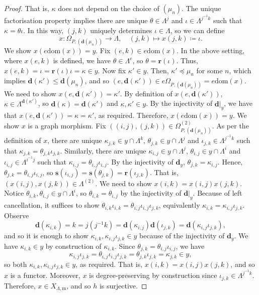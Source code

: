 \documentclass[11pt]{amsart}
\theoremstyle{definition}
\numberwithin{thm}{section}
\numberwithin{equation}{section}
\newcommand{\range}{\mathbf{r}}
\newcommand{\source}{\mathbf{s}}
\newcommand{\degree}{\mathbf{d}}
\newcommand{\morphdom}[1]{\mathrm{dom}(#1)}
\newcommand{\M}{\mathrm{m}}
\newcommand{\PS}[2]{X_{#2, #1}}
\newcommand{\composablepairs}[1]{#1^{(2)}}
\begin{document}
\begin{proof}
That is, $\kappa$ does not depend on the choice of $(\mu_n)$. 
The unique factorisation property implies there are unique $\theta \in \Lambda^j$ and $\iota \in \Lambda^{j^{-1}k}$ such that $\kappa = \theta\iota$. 
In this way, $(j, k)$ uniquely determines $\iota \in \Lambda$, so we can define
\[
x \colon \Omega_{P, (\degree(\mu_n))} \to \Lambda, \quad 
(j, k) \mapsto x(j, k) \coloneqq \iota.
\]
We show $x(e\morphdom{x}) = y$.
Fix $(e, k) \in e\morphdom{x}$.
In the above setting, where $x(e, k)$ is defined, we have $\theta \in \Lambda^e$, so $\theta = \range(\iota)$. 
Thus, $x(e, k) = \iota = \range(\iota)\iota = \kappa \in y$. 
Now fix $\kappa' \in y$. 
Then, $\kappa' \preceq \mu_n$ for some $n$, which implies $\degree(\kappa') \leq \degree(\mu_n)$, and so $(e, \degree(\kappa')) \in e\Omega_{P, (\degree(\mu_n))} = e\morphdom{x}$. 
We need to show $x(e, \degree(\kappa')) = \kappa'$. 
By definition of $x(e, \degree(\kappa'))$, $\kappa \in \Lambda^{\degree(\kappa')}$, so $\degree(\kappa) = \degree(\kappa')$ and $\kappa, \kappa' \in y$. 
By the injectivity of $\degree|_y$, we have that $x(e, \degree(\kappa')) = \kappa = \kappa'$, as required.
Therefore, $x(e\morphdom{x}) = y$.
We show $x$ is a graph morphism.
Fix $((i, j), (j, k)) \in \composablepairs{\Omega_{P, (\degree(\mu_n))}}$.
As per the definition of $x$, there are unique $\kappa_{j, k} \in y \cap \Lambda^k$, $\theta_{j, k} \in y \cap \Lambda^j$ and $\iota_{j, k} \in \Lambda^{j^{-1}k}$ such that $\kappa_{j, k} = \theta_{j, k}\iota_{j, k}$.
Similarly, there are unique $\kappa_{i, j} \in y \cap \Lambda^j$, $\theta_{i, j} \in y \cap \Lambda^i$ and $\iota_{i, j} \in \Lambda^{i^{-1}j}$ such that $\kappa_{i, j} = \theta_{i, j}\iota_{i, j}$. 
By the injectivity of $\degree_y$, $\theta_{j, k} = \kappa_{i, j}$. 
Hence, $\theta_{j, k} = \theta_{i, j}\iota_{i, j}$, so $\source(\iota_{i, j}) = \source(\theta_{j, k}) = \range(\iota_{j, k})$. 
That is, $(x(i, j), x(j, k)) \in \composablepairs{\Lambda}$.
We need to show $x(i, k) = x(i, j)x(j, k)$. 
Notice $\theta_{i, k}, \theta_{i, j} \in y \cap \Lambda^i$, so $\theta_{i, k} = \theta_{i, j}$ by the injectivity of $\degree|_y$. 
Because of left cancellation, it suffices to show $\theta_{i, k}\iota_{i, k} = \theta_{i, j}\iota_{i, j}\iota_{j, k}$, equivalently $\kappa_{i, k} = \kappa_{i, j}\iota_{j, k}$. 
Observe 
\[
\degree(\kappa_{i, k}) 
= k 
= j(j^{-1}k) 
= \degree(\kappa_{i, j})\degree(\iota_{j, k}) 
= \degree(\kappa_{i, j}\iota_{j, k}),
\]
and so it is enough to show $\kappa_{i, k}, \kappa_{i, j}\iota_{j, k} \in y$ because of the injectivity of $\degree_y$. 
We have $\kappa_{i, k} \in y$ by construction of $\kappa_{i, k}$. 
Since $\theta_{j, k} = \theta_{i, j}\iota_{i, j}$, we have
\[
\kappa_{i, j}\iota_{j, k}
= \theta_{i, j}\iota_{i, j}\iota_{j, k} 
= \theta_{j, k}\iota_{j, k} 
= \kappa_{j, k}
\in y,
\]
so both $\kappa_{i, k}, \kappa_{i, j}\iota_{j, k} \in y$, as required. 
That is, $x(i, k) = x(i, j)x(j, k)$, and so $x$ is a functor.
Moreover, $x$ is degree-preserving by construction since $\iota_{j, k} \in \Lambda^{j^{-1}k}$. 
Therefore, $x \in \PS{\M}{\Lambda}$, and so $h$ is surjective.


\end{proof}
\end{document}
